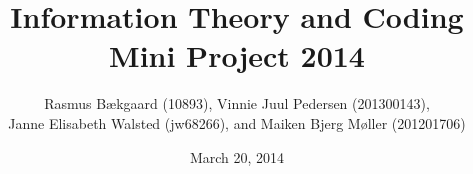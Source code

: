 \documentclass[10pt, oneside]{article}
\title{Information Theory and Coding \\ Mini Project 2014}
\author{Rasmus Bækgaard (10893), 
Vinnie Juul Pedersen (201300143),\\ 
Janne Elisabeth Walsted (jw68266), and 
Maiken Bjerg Møller (201201706)}
\date{March 20, 2014}
\begin{document}
\maketitle

\listoffixmes




%
%





\end{document}
